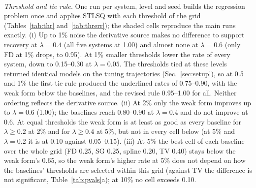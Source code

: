 \begin{table}[t]\centering\caption{Exact-support rate on the 20 test seeds for every STLSQ threshold $\lambda$ of the tuning grid (smoothing parameters as tuned). Shaded: tuned threshold (the main runs). Underlined: threshold selected by the first tie rule. Diagnostic only: these cells use the test seeds.}\label{tab:thr}
\setlength{\fboxsep}{1pt}\small\\[4pt]
\end{table}

\begin{table}[t]\centering\caption{Mean coefficient error on the 20 test seeds at 5\% noise for every threshold of the grid; marks as in Table~\ref{tab:thr}.}\label{tab:threrr}
\setlength{\tabcolsep}{5pt}\setlength{\fboxsep}{1pt}\small\end{table}

\textit{Threshold and tie rule.} One run per system, level and seed builds the regression problem once and applies STLSQ with each threshold of the grid (Tables~\ref{tab:thr} and~\ref{tab:threrr}); the shaded cells reproduce the main runs exactly. (i) Up to 1\% noise the derivative source makes no difference to support recovery at $\lambda=0.4$ (all five systems at 1.00) and almost none at $\lambda=0.6$ (only FD at 1\% drops, to 0.95). At 1\% smaller thresholds lower the rate of every system, down to 0.15--0.30 at $\lambda=0.05$. The thresholds tied at these levels returned identical models on the tuning trajectories (Sec.~\ref{sec:setup}), so at 0.5 and 1\% the first tie rule produced the underlined rates of 0.75--0.90, with the weak form below the baselines, and the revised rule 0.95--1.00 for all. Neither ordering reflects the derivative source. (ii) At 2\% only the weak form improves up to $\lambda=0.6$ (1.00); the baselines reach 0.80--0.90 at $\lambda=0.4$ and do not improve at 0.6. At equal thresholds the weak form is at least as good as every baseline for $\lambda\ge0.2$ at 2\% and for $\lambda\ge0.4$ at 5\%, but not in every cell below (at 5\% and $\lambda=0.2$ it is at 0.10 against 0.05--0.15). (iii) At 5\% the best cell of each baseline over the whole grid (FD 0.25, SG 0.25, spline 0.20, TV 0.40) stays below the weak form's 0.65, so the weak form's higher rate at 5\% does not depend on how the baselines' thresholds are selected within this grid (against TV the difference is not significant, Table~\ref{tab:pvals}a); at 10\% no cell exceeds 0.10.

